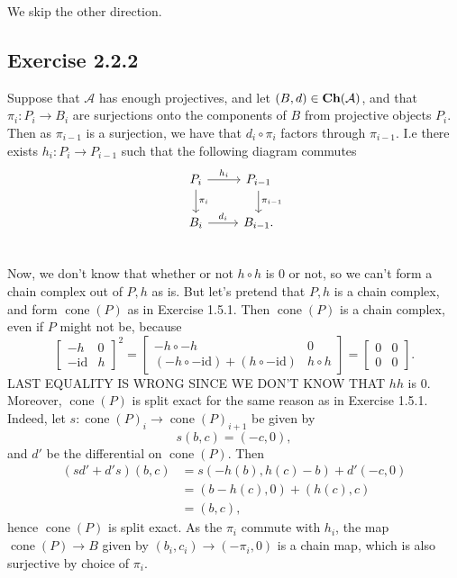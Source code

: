 \documentclass{article}
\theoremstyle{definition}
\DeclareMathOperator{\cone}{cone}
\newcommand{\id}{\text{id}}
\newcommand{\catname}[1]{{\normalfont\textbf{#1}}}
\newcommand{\Ch}{\catname{Ch}}
\begin{document}
We skip the other direction.

\subsection*{Exercise 2.2.2}

Suppose that $\mathcal{A}$ has enough projectives, and let $(B, d) \in
\Ch(\mathcal{A})$, and that $\pi_i : P_i \to B_i$ are surjections onto the
components of $B$ from projective objects $P_i$. Then as $\pi_{i - 1}$ is a
surjection, we have that $d_i \circ \pi_i$ factors through $\pi_{i - 1}$. I.e
there exists $h_i : P_i \to P_{i - 1}$ such that the following diagram commutes
\[
	\begin{tikzcd}
		P_i \arrow[d, "\pi_i"] \arrow[r, "h_i"] & P_{i-1} \arrow[d, "\pi_{i-1}"] \\
		B_i \arrow[r, "d_i"] & B_{i-1}. \\
	\end{tikzcd}
\]
Now, we don't know that whether or not $h \circ h$ is $0$ or not, so we can't
form a chain complex out of $P, h$ as is. But let's pretend that $P, h$ is a
chain complex, and form $\cone(P)$ as in Exercise 1.5.1. Then $\cone(P)$ is a
chain complex, even if $P$ might not be, because 
\[
	\begin{bmatrix}
		-h & 0 \\
		-\id & h
	\end{bmatrix}^2
	=
	\begin{bmatrix}
		-h \circ - h & 0 \\
		(-h \circ -\id) + (h \circ - \id) & h \circ h
	\end{bmatrix}
	=
	\begin{bmatrix}
		0 & 0 \\
		0 & 0
	\end{bmatrix}.
\] 
LAST EQUALITY IS WRONG SINCE WE DON'T KNOW THAT $hh$ is $0$. Moreover,
$\cone(P)$ is split exact for the same reason as in Exercise 1.5.1. Indeed, let
$s : \cone(P)_i \to \cone(P)_{i + 1}$ be given by 
\[
	s(b, c) = (-c, 0),
\] 
and $d'$ be the differential on $\cone(P)$. Then 
\begin{align*}
	(sd' + d's)(b, c)
	&=
	s(-h(b), h(c) - b) + d'(-c, 0) \\
	&=
	(b - h(c), 0) + (h(c), c) \\
	&=
	(b, c), 
\end{align*} 
hence $\cone(P)$ is split exact. As the $\pi_i$ commute with $h_i$, the map
$\cone(P) \to B$ given by $(b_i, c_i) \to (-\pi_i, 0)$ is a chain map, which is
also surjective by choice of $\pi_i$.
\end{document}
